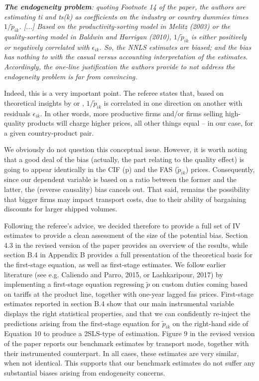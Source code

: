\documentclass[a4paper,12pt]{article}
\begin{document}
\textit{\textbf{The endogeneity problem}: quoting Footnote 14 of the paper, the authors
are estimating ti and ts(k) as coefficients on the industry or country
dummies times $1/\widetilde{p}_{ik}$. [...] Based on the productivity-sorting model in Melitz (2003) or the quality-sorting
model in Baldwin and Harrigan (2010),  $1/\widetilde{p}_{ik}$ is either positively
or negatively correlated with $\epsilon_{ik}$. So, the NNLS estimates are biased; and
the bias has nothing to with the casual versus accounting interpretation of
the estimates. Accordingly, the one-line justification the authors provide
to not address the endogeneity problem is far from convincing.}

Indeed, this is a very important point. The referee states that, based on theoretical insights by \citet{melitz} or \citet{baldwin_harrigan}, $1/\widetilde{p}_{ik}$ is correlated in one direction on another with residuals $\epsilon_{ik}$. In other words, more productive firms and/or firms selling high-quality products will charge higher prices, all other things equal – in our case, for a given country-product pair.

We obviously do not question this conceptual issue. However, it is worth noting that a good deal of the bias (actually, the part relating to the quality effect) is going to appear identically in the CIF (p) and the FAS ($\widetilde{p}_{ik}$) prices. Consequently, since our dependent variable is based on a ratio between the former and the latter, the (reverse causality) bias cancels out. That said, remains the possibility that bigger firms may impact transport costs, due to their ability of bargaining discounts for larger shipped volumes.

Following the referee's advice, we decided therefore to provide a full set of IV estimates to provide a clean assessment of the size of the potential bias. Section 4.3 in the revised version of the paper provides an overview of the results, while section B.4 in Appendix B provides a full presentation of the theoretical basis for the first-stage equation, as well as first-stage estimates. We follow earlier literature (see e.g. Caliendo and Parro, 2015, or Lashkaripour, 2017) by implementing a first-stage equation regressing $\widetilde{p}$ on custom duties coming based on tariffs at the product line, together with one-year lagged fas prices. First-stage estimates reported in section B.4 show that our main instrumental variable displays the right statistical properties, and that we can confidently re-inject the predictions arising from the first-stage equation for $\widetilde{p}_{ik}$ on the right-hand side of Equation 10 to produce a 2SLS-type of estimation. Figure 9 in the revised version of the paper reports our benchmark estimates by transport mode, together with their instrumented counterpart. In all cases, these estimates are very similar, when not identical. This supports that our benchmark estimates do not suffer any substantial biases arising from endogeneity concerns.
\end{document}
